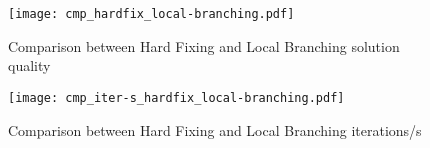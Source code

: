 \begin{figure}[htbp]
	\centering
	\texttt{[image: cmp\_hardfix\_local-branching.pdf]}
	\caption{Comparison between Hard Fixing and Local Branching solution quality \label{fig:hardFixLocBranchCMP}}
\end{figure}

\begin{figure}[htbp]
	\centering
	\texttt{[image: cmp\_iter-s\_hardfix\_local-branching.pdf]}
	\caption{Comparison between Hard Fixing and Local Branching iterations/s \label{fig:hardFixLocBranchIterCMP}}
\end{figure}